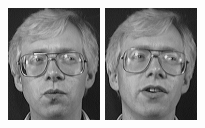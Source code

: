 \begin{figure}[ht]
 \includegraphics[width=\columnwidth/11]{ch3/figures/s2_3.png}
 \includegraphics[width=\columnwidth/11]{ch3/figures/s2_4.png}

\end{figure}
